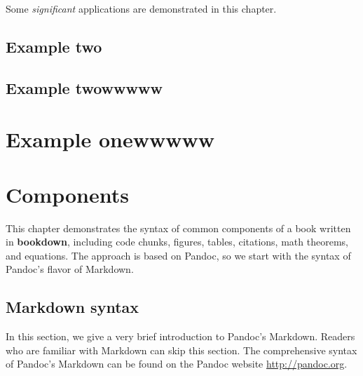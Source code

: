 \documentclass[]{krantz}
\begin{document}
Some \emph{significant} applications are demonstrated in this chapter.

\hypertarget{example-two-1}{%
\section{Example two}\label{example-two-1}}

\hypertarget{example-twowwwww-1}{%
\section{Example twowwwww}\label{example-twowwwww-1}}

\hypertarget{example-onewwwww-1}{%
\chapter{Example onewwwww}\label{example-onewwwww-1}}

\hypertarget{components-1}{%
\chapter{Components}\label{components-1}}

This chapter demonstrates the syntax of common components of a book written in \textbf{bookdown}, including code chunks, figures, tables, citations, math theorems, and equations. The approach is based on Pandoc, so we start with the syntax of Pandoc's flavor of Markdown.

\hypertarget{markdown-syntax-1}{%
\section{Markdown syntax}\label{markdown-syntax-1}}

In this section, we give a very brief introduction to Pandoc's Markdown. Readers who are familiar with Markdown can skip this section. The comprehensive syntax of Pandoc's Markdown can be found on the Pandoc website \url{http://pandoc.org}.



\printindex
\end{document}

